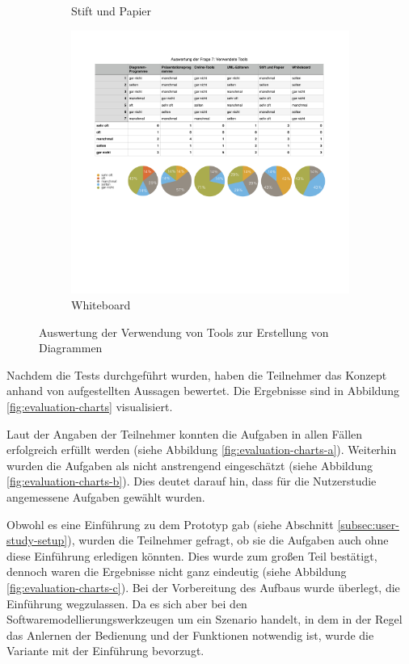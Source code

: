 \begin{figure}[hbt]
\begin{minipage}{.65\textwidth}
\begin{subfigure}[t]{\subfigurewidth}
        \caption{Stift und Papier}
        \label{fig:used-tools-charts-e}
    \end{subfigure}
    \begin{subfigure}[t]{\subfigurewidth}
        \centering
        \includegraphics[scale=\graphicsscale]{assets/used-tools-charts-f}
        \caption{Whiteboard}
        \label{fig:used-tools-charts-f}
    \end{subfigure}
\end{minipage}
\caption{Auswertung der Verwendung von Tools zur Erstellung von Diagrammen}
\label{fig:used-tools-charts}
\end{figure}

Nachdem die Tests durchgeführt wurden, haben die Teilnehmer das Konzept anhand von aufgestellten Aussagen bewertet. Die Ergebnisse sind in Abbildung \ref{fig:evaluation-charts} visualisiert.

Laut der Angaben der Teilnehmer konnten die Aufgaben in allen Fällen erfolgreich erfüllt werden (siehe Abbildung \ref{fig:evaluation-charts-a}). Weiterhin wurden die Aufgaben als nicht anstrengend eingeschätzt (siehe Abbildung \ref{fig:evaluation-charts-b}). Dies deutet darauf hin, dass für die Nutzerstudie angemessene Aufgaben gewählt wurden.

Obwohl es eine Einführung zu dem Prototyp gab (siehe Abschnitt \ref{subsec:user-study-setup}), wurden die Teilnehmer gefragt, ob sie die Aufgaben auch ohne diese Einführung erledigen könnten. Dies wurde zum großen Teil bestätigt, dennoch waren die Ergebnisse nicht ganz eindeutig (siehe Abbildung \ref{fig:evaluation-charts-c}). Bei der Vorbereitung des Aufbaus wurde überlegt, die Einführung wegzulassen. Da es sich aber bei den Softwaremodellierungswerkzeugen um ein Szenario handelt, in dem in der Regel das Anlernen der Bedienung und der Funktionen notwendig ist, wurde die Variante mit der Einführung bevorzugt.

